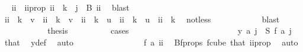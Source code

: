\begin{isabellebody}
\ \isamarkupfalse%
\ ii\ \ ii{\isacharunderscore}{\kern0pt}prop{\isacharcolon}{\kern0pt}{\isachardoublequoteopen}\ ii\ {\isacharless}{\kern0pt}\ k\ {\isasymand}\ j\ {\isasymin}\ B\ ii{\isachardoublequoteclose}\ \isamarkupfalse%
\ blast\isanewline
\ \ \ \ \ \ \ \ \isamarkupfalse%
\ \isamarkupfalse%
\ {\isachardoublequoteopen}ii\ {\isacharless}{\kern0pt}\ k\ {\isacharminus}{\kern0pt}\ v{\isachardoublequoteclose}\ {\isacharbar}{\kern0pt}\ {\isachardoublequoteopen}ii\ {\isasymge}\ k\ {\isacharminus}{\kern0pt}\ v\ {\isasymand}\ ii\ {\isacharless}{\kern0pt}\ k\ {\isacharminus}{\kern0pt}\ u{\isachardoublequoteclose}\ {\isacharbar}{\kern0pt}\ {\isachardoublequoteopen}ii\ {\isasymge}\ k\ {\isacharminus}{\kern0pt}\ u\ {\isasymand}\ ii\ {\isacharless}{\kern0pt}\ k{\isachardoublequoteclose}\ \isamarkupfalse%
\ not{\isacharunderscore}{\kern0pt}less\isanewline
\ \ \ \ \ \ \ \ \ \ \isamarkupfalse%
\ blast\isanewline
\ \ \ \ \ \ \ \ \isamarkupfalse%
\ \isamarkupfalse%
\ {\isacharquery}{\kern0pt}thesis\isanewline
\ \ \ \ \ \ \ \ \isamarkupfalse%
\ cases\isanewline
\ \ \ \ \ \ \ \ \ \ \isamarkupfalse%
\ {}\isanewline
\ \ \ \ \ \ \ \ \ \ \isamarkupfalse%
\ \isamarkupfalse%
\ {\isachardoublequoteopen}y\ a\ j\ {\isacharequal}{\kern0pt}\ S\ {\isacharparenleft}{\kern0pt}{\isacharquery}{\kern0pt}f\ a{\isacharparenright}{\kern0pt}\ j{\isachardoublequoteclose}\ \isamarkupfalse%
\ that{\isacharparenleft}{\kern0pt}{}{\isacharparenright}{\kern0pt}\ \isamarkupfalse%
\ y{\isacharunderscore}{\kern0pt}def\ \isamarkupfalse%
\ auto\isanewline
\ \ \ \ \ \ \ \ \ \ \isamarkupfalse%
\ \isamarkupfalse%
\ {\isachardoublequoteopen}\ {\isachardot}{\kern0pt}{\isachardot}{\kern0pt}{\isachardot}{\kern0pt}\ {\isacharequal}{\kern0pt}\ {\isacharparenleft}{\kern0pt}{\isacharquery}{\kern0pt}f\ a{\isacharparenright}{\kern0pt}\ ii{\isachardoublequoteclose}\ \isamarkupfalse%
\ Bf{\isacharunderscore}{\kern0pt}props{\isacharparenleft}{\kern0pt}{}{\isacharparenright}{\kern0pt}\ f{\isacharunderscore}{\kern0pt}cube\ that{\isacharparenleft}{\kern0pt}{}{\isacharparenright}{\kern0pt}\ ii{\isacharunderscore}{\kern0pt}prop\ \isamarkupfalse%
\ auto\isanewline
\ \ \ \ \ \ \ \ \ \ \isamarkupfalse%
\ \isamarkupfalse%

\end{isabellebody}
